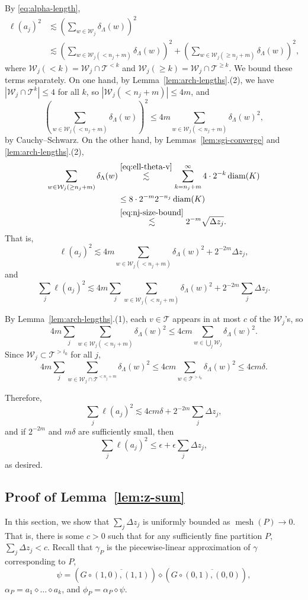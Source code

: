 \documentclass[12pt,reqno]{amsart}
\newcommand{\cT}{\mathcal{T}}
\newcommand{\cW}{\mathcal{W}}
\DeclareMathOperator{\mesh}{mesh}
\theoremstyle{remark}
\newcommand{\0}{\mathbf{0}}
\renewcommand{\1}{\mathbf 1}
\DeclareMathOperator{\diam}{diam}
\begin{document}
  By \eqref{eq:alpha-length},
  \[
  \begin{aligned}
    \ell(a_j)^2 &\lesssim \left(\sum_{w\in \cW_j} \delta_\Lambda(w)\right)^2 \\ 
    &\lesssim \left(\sum_{w\in \cW_j(<n_j + m)}\delta_\Lambda(w)\right)^2 + \left(\sum_{w\in \cW_j(\ge n_j + m)}\delta_\Lambda(w)\right)^2,
\end{aligned}
  \]
  where $\cW_j(< k) = \cW_j\cap \cT^{< k}$ and $\cW_j(\ge k) = \cW_j\cap \cT^{\ge k}$.
  We bound these terms separately. On one hand, by Lemma~\ref{lem:arch-lengths}.(2), we have $|\cW_j\cap\cT^k|\le 4$ for all $k$, so $|\cW_j(<n_j + m)| \le 4m$, and
  $$\left(\sum_{w\in \cW_j(<n_j + m)}\delta_\Lambda(w)\right)^2 \le 4m \sum_{w\in \cW_j(<n_j + m)}\delta_\Lambda(w)^2,$$
  by Cauchy--Schwarz. On the other hand, by Lemmas~\ref{lem:sgi-converge} and \ref{lem:arch-lengths}.(2),
  $$
  \begin{aligned}
  \sum_{w\in \cW_j(\ge n_j + m)}\delta_\Lambda(w) &\stackrel{\eqref{eq:ell-theta-v}}{\lesssim} \sum_{k=n_j+m}^\infty 4 \cdot 2^{-k}\diam(K) \\
  & \le 8 \cdot 2^{-m} 2^{-n_j}\diam(K) 
\\ &\stackrel{\eqref{eq:nj-size-bound}} 
  {\lesssim} 2^{-m} \sqrt{\Delta z_j}.
  \end{aligned}
  $$
  That is,
  $$\ell(a_j)^2\lesssim 4m \sum_{w\in \cW_j(<n_j + m)}\delta_\Lambda(w)^2 + 2^{-2m} \Delta z_j,$$
  and
  $$\sum_j \ell(a_j)^2\lesssim 4m \sum_j \sum_{w\in \cW_j(<n_j + m)}\delta_\Lambda(w)^2 + 2^{-2m}\sum_j \Delta z_j.$$
  
  By Lemma~\ref{lem:arch-lengths}.(1), each $v\in \cT$ appears in at most $c$ of the $\cW_j$'s, so
  $$4m \sum_j \sum_{w\in \cW_j(<n_j + m)}\delta_\Lambda(w)^2 \le 4cm \sum_{w\in \bigcup_j \cW_j}\delta_\Lambda(w)^2.$$
  Since $\cW_j \subset \cT^{>i_0}$ for all $j$,
  $$4m \sum_j \sum_{w\in \cW_j \cap \cT^{<n_j + m}}\delta_\Lambda(w)^2 \le 4cm \sum_{w\in \cT^{>i_0}}\delta_\Lambda(w)^2 \le 4cm\delta.$$

  Therefore, 
  $$\sum_j \ell(a_j)^2\lesssim 4cm\delta + 2^{-2m} \sum_j \Delta z_j,$$
  and if $2^{-2m}$ and $m \delta$ are sufficiently small, then 
  $$\sum_j \ell(a_j)^2 \le \epsilon + \epsilon  \sum_j \Delta z_j,$$
  as desired.

\subsection{Proof of Lemma~\ref{lem:z-sum}}
In this section, we show that $\sum_j \Delta z_j$ is uniformly bounded as $\mesh(P)\to 0$. That is, there is some $c>0$ such that for any sufficiently fine partition $P$, $\sum_j \Delta z_j < c$. Recall that $\gamma_P$ is the piecewise-linear approximation of $\gamma$ corresponding to $P$,
 $$\psi = (G\circ \overline{(1,0),(1,1)}) \diamond (G\circ \overline{(0,1),(0,0)}),$$
 $\alpha_P = a_1\diamond \dots \diamond a_k$, and $\phi_P = \alpha_P \diamond \psi.$
\end{document}
